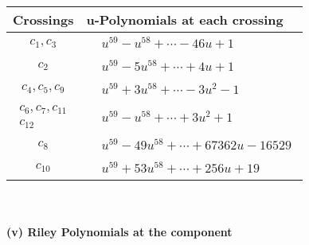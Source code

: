 \documentclass[1p]{elsarticle_modified}
\theoremstyle{definition}
\begin{document}
\begin{tabular}{m{50pt}|m{274pt}}
Crossings & \hspace{64pt}u-Polynomials at each crossing \\
\hline $$\begin{aligned}c_{1},c_{3}\end{aligned}$$&$\begin{aligned}
&u^{59}- u^{58}+\cdots-46 u+1
\end{aligned}$\\
\hline $$\begin{aligned}c_{2}\end{aligned}$$&$\begin{aligned}
&u^{59}-5 u^{58}+\cdots+4 u+1
\end{aligned}$\\
\hline $$\begin{aligned}c_{4},c_{5},c_{9}\end{aligned}$$&$\begin{aligned}
&u^{59}+3 u^{58}+\cdots-3 u^2-1
\end{aligned}$\\
\hline $$\begin{aligned}c_{6},c_{7},c_{11}\\c_{12}\end{aligned}$$&$\begin{aligned}
&u^{59}- u^{58}+\cdots+3 u^2+1
\end{aligned}$\\
\hline $$\begin{aligned}c_{8}\end{aligned}$$&$\begin{aligned}
&u^{59}-49 u^{58}+\cdots+67362 u-16529
\end{aligned}$\\
\hline $$\begin{aligned}c_{10}\end{aligned}$$&$\begin{aligned}
&u^{59}+53 u^{58}+\cdots+256 u+19
\end{aligned}$\\
\hline
\end{tabular}\\~\\
\newpage\renewcommand{\arraystretch}{1}
\flushleft \textbf{(v) Riley Polynomials at the component}\newline \\
\end{document}

